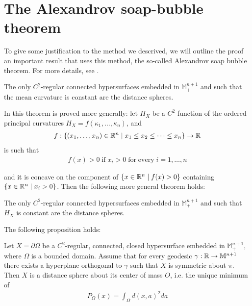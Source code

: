 \section{The Alexandrov soap-bubble theorem}

To give some justification to the method we descrived, we will outline the proof an important result that uses this method, the so-called Alexandrov soap bubble theorem. For more details, see \cite{italiani}. 

\begin{theorem}
	The only $C^2$-regular connected hypersurfaces embedded in $\mathbb{M}^{n+1}_+$ and such that the mean curvature is constant are the distance spheres.\label{Alexandrov theorem} 
\end{theorem}
In \cite{italiani} this theorem is proved more generally: let $H_X$ be a $C^2$ function of the ordered principal curvatures $H_X=f(\kappa_1, \dots, \kappa_n)$, and
\begin{align*}
	f:\{(x_1, \dots, x_n)\in \mathbb{R}^n \;|\;x_1\leq x_2\leq \dots \leq x_n \}\rightarrow \mathbb{R}
\end{align*}
is such that
\begin{align*}
	f(x)>0 \;\mathrm{if \;} x_i>0 \; \mathrm{for \; every \;} i=1, \dots, n
\end{align*}

and it is concave on the component of $\{x\in \mathbb{R}^n \;|\; f(x)>0\}$ containing $\{x\in \mathbb{R}^n \;|\;  x_i>0 \}$. Then the following more general theorem holds: 

\begin{theorem}
	The only $C^2$-regular connected hypersurfaces embedded in $\mathbb{M}^{n+1}_+$ and such that $H_X$ is constant are the distance spheres. 
\end{theorem}

The following proposition holds:

\begin{proposition}
	\label{proposition symmetry conclusion}	Let $X=\partial\Omega$ be a $C^2$-regular, connected, closed hypersurface embedded in $\mathbb{M}^{n+1}_+$, where $\Omega$ is a bounded domain. Assume that for every geodesic $\gamma:\mathbb{R}\rightarrow \mathbb{M}^{n+1}$ there exists a hyperplane orthogonal to $\gamma$ such that $X$ is symmetric about $\pi$. Then $X$ is a distance sphere about its center of mass $O$, i.e. the unique minimum of 
	\begin{align*}
		P_\Omega(x)=\int_\Omega d(x, a)^2 da
	\end{align*}
\end{proposition}

